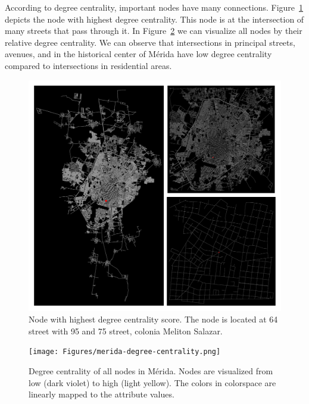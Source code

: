 According to degree centrality, important nodes have many connections.
Figure~\ref{fig:merida-max-node-degree-centrality} depicts the node with highest degree centrality.
This node is at the intersection of many streets that pass through it.
In Figure~\ref{fig:merida-degree-centrality} we can visualize all nodes by their relative degree centrality.
We can observe that intersections in principal streets, avenues, and in the historical center of Mérida have low degree centrality compared to intersections in residential areas.

\begin{figure}[htpb]
  \centering
  \includegraphics[width=1.0\textwidth]{Figures/merida-node-degree-centrality.png}
  \caption{Node with highest degree centrality score. The node is located at 64 street with 95 and 75 street, colonia Meliton Salazar.
    \label{fig:merida-max-node-degree-centrality}}
\end{figure}

\begin{figure}[htpb]
  \centering
  \texttt{[image: Figures/merida-degree-centrality.png]}
  \caption{Degree centrality of all nodes in Mérida. Nodes are visualized from low (dark violet) to high (light yellow). The colors in colorspace are linearly mapped to the attribute values.
    \label{fig:merida-degree-centrality}}
\end{figure}

